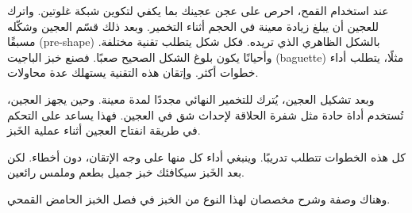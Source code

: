 عند استخدام القمح، احرص على عجن عجينك بما يكفي لتكوين شبكة غلوتين. واترك للعجين أن يبلغ زيادة معينة في الحجم أثناء التخمير. وبعد ذلك قسّم العجين وشكّله مسبقًا \textenglish{(pre-shape)} بالشكل الظاهري الذي تريده. فكل شكل يتطلب تقنية مختلفة. وأحيانًا يكون بلوغ الشكل الصحيح صعبًا. فصنع خبز الباجيت \textenglish{(baguette)} مثلًا، يتطلب أداء خطوات أكثر. وإتقان هذه التقنية يستهلك عدة محاولات.

وبعد تشكيل العجين، يُترك للتخمير النهائي مجددًا لمدة معينة. وحين يجهز العجين، تُستخدم أداة حادة مثل شفرة الحلاقة لإحداث شق في العجين. فهذا يساعد على التحكم في طريقة انفتاح العجين أثناء عملية الخَبز.

كل هذه الخطوات تتطلب تدريبًا. وينبغي أداء كل منها على وجه الإتقان، دون أخطاء. لكن بعد الخَبز سيكافئك خبز جميل بطعم وملمس رائعين.

وهناك وصفة وشرح مخصصان لهذا النوع من الخبز في فصل الخبز الحامض القمحي.
